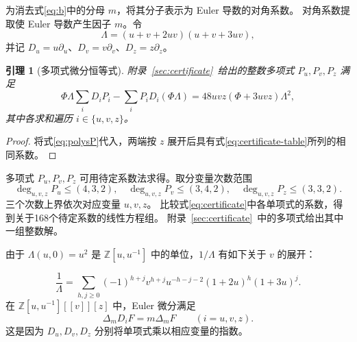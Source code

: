 \documentclass[a4paper,11pt]{article}
\numberwithin{equation}{section}
\theoremstyle{chinese}
\newtheorem{lemma}{引理}[section]
\newcommand{\Z}{\mathbb Z}
\newcommand{\diag}{\Delta}
\begin{document}
为消去式\eqref{eq:b}中的分母 $m$，将其分子表示为 Euler 导数的对角系数。
对角系数提取使 Euler 导数产生因子 $m$。令
\begin{equation}\label{eq:L}
\Lambda=(u+v+2uv)(u+v+3uv),
\end{equation}
并记 $D_u=u\partial_u$、$D_v=v\partial_v$、$D_z=z\partial_z$。

\begin{lemma}[多项式微分恒等式]\label{lem:certificate}
附录~\ref{sec:certificate}~给出的整数多项式 $P_u,P_v,P_z$ 满足
\begin{equation}\label{eq:certificate}
\Phi\Lambda\sum_iD_iP_i-\sum_iP_iD_i(\Phi\Lambda)
=48uvz(\Phi+3uvz)\Lambda^2,
\end{equation}
其中各求和遍历 $i\in\{u,v,z\}$。
\end{lemma}
\begin{proof}
将式\eqref{eq:polysP}代入，两端按 $z$ 展开后具有式\eqref{eq:certificate-table}所列的相同系数。
\end{proof}

多项式 $P_u,P_v,P_z$ 可用待定系数法求得。取分变量次数范围
\begin{equation}\label{eq:degree-box}
\deg_{u,v,z}P_u\le(4,3,2),\quad
\deg_{u,v,z}P_v\le(3,4,2),\quad
\deg_{u,v,z}P_z\le(3,3,2).
\end{equation}
三个次数上界依次对应变量 $u,v,z$。
比较式\eqref{eq:certificate}中各单项式的系数，得到关于168个待定系数的线性方程组。
附录~\ref{sec:certificate}~中的多项式给出其中一组整数解。

由于 $\Lambda(u,0)=u^2$ 是 $\Z[u,u^{-1}]$ 中的单位，$1/\Lambda$ 有如下关于 $v$ 的展开：

\begin{equation}\label{eq:Lexpansion}
\frac1\Lambda=\sum_{h,j\ge0}(-1)^{h+j}
v^{h+j}u^{-h-j-2}(1+2u)^h(1+3u)^j.
\end{equation}
在 $\Z[u,u^{-1}][[v]][z]$ 中，Euler 微分满足
\begin{equation}\label{eq:eulerdiag}
\diag_mD_iF=m\diag_mF\qquad(i=u,v,z).
\end{equation}
这是因为 $D_u,D_v,D_z$ 分别将单项式乘以相应变量的指数。
\end{document}
